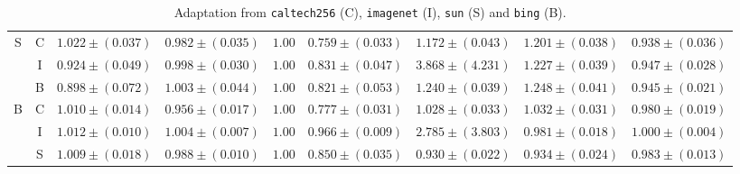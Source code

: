\documentclass[twoside,11pt]{article}
\newcommand{\1}{\mat{1}}
\begin{document}
\begin{table}[t]
\begin{tabular}{ccccccccc}
\hline
 \multirow{3}{*}{ \tiny{S}} & \tiny{C} & $\scriptscriptstyle{ 1.022   \pm
   ( 0.037 )}$ & $\scriptscriptstyle{ 0.982   \pm ( 0.035 )}$ &
 $\scriptscriptstyle{1.00}$&  $\scriptscriptstyle{ 0.759   \pm ( 0.033 )}$ & $\scriptscriptstyle{ 1.172   \pm ( 0.043 )}$ & $\scriptscriptstyle{ 1.201   \pm ( 0.038 )}$ & $\mathbf{\scriptscriptstyle{ 0.938   \pm ( 0.036 )}}$\\
& \tiny{I} & $\mathbf{\scriptscriptstyle{ 0.924   \pm ( 0.049 )}}$ &
$\scriptscriptstyle{ 0.998   \pm ( 0.030 )}$ & $\scriptscriptstyle{1.00}$& $\scriptscriptstyle{ 0.831   \pm ( 0.047 )}$ & $\scriptscriptstyle{ 3.868   \pm ( 4.231 )}$ & $\scriptscriptstyle{ 1.227   \pm ( 0.039 )}$ & $\scriptscriptstyle{ 0.947   \pm ( 0.028 )}$\\
& \tiny{B} & $\mathbf{\scriptscriptstyle{ 0.898   \pm ( 0.072 )}}$ &
$\scriptscriptstyle{ 1.003   \pm ( 0.044 )}$ & $\scriptscriptstyle{1.00}$& $\scriptscriptstyle{ 0.821   \pm ( 0.053 )}$ & $\scriptscriptstyle{ 1.240   \pm ( 0.039 )}$ & $\scriptscriptstyle{ 1.248   \pm ( 0.041 )}$ & $\scriptscriptstyle{ 0.945   \pm ( 0.021 )}$\\
\hline
 \multirow{3}{*}{ \tiny{B}} & \tiny{C} & $\scriptscriptstyle{ 1.010   \pm
   ( 0.014 )}$ & $\mathbf{\scriptscriptstyle{ 0.956   \pm ( 0.017 )}}$ &
 $\scriptscriptstyle{1.00}$&  $\scriptscriptstyle{ 0.777   \pm ( 0.031 )}$ & $\scriptscriptstyle{ 1.028   \pm ( 0.033 )}$ & $\scriptscriptstyle{ 1.032   \pm ( 0.031 )}$ & $\scriptscriptstyle{ 0.980   \pm ( 0.019 )}$\\
& \tiny{I} & $\scriptscriptstyle{ 1.012   \pm ( 0.010 )}$ & $\scriptscriptstyle{
  1.004   \pm ( 0.007 )}$ &  $\scriptscriptstyle{1.00}$& $\scriptscriptstyle{ 0.966   \pm ( 0.009 )}$ & $\scriptscriptstyle{ 2.785   \pm ( 3.803 )}$ & $\mathbf{\scriptscriptstyle{ 0.981   \pm ( 0.018 )}}$ & $\scriptscriptstyle{ 1.000   \pm ( 0.004 )}$\\
& \tiny{S} & $\scriptscriptstyle{ 1.009   \pm ( 0.018 )}$ & $\scriptscriptstyle{ 0.988   \pm ( 0.010 )}$ &$\scriptscriptstyle{1.00}$& $\scriptscriptstyle{ 0.850   \pm ( 0.035 )}$ & $\mathbf{\scriptscriptstyle{ 0.930   \pm ( 0.022 )}}$ & $\scriptscriptstyle{ 0.934   \pm ( 0.024 )}$ & $\scriptscriptstyle{ 0.983   \pm ( 0.013 )}$\\
\hline
 \end{tabular}
\caption{ Adaptation from {\tt caltech256} (C), {\tt imagenet} (I),
  {\tt sun} (S) and {\tt bing} (B).}
\label{table:image}
\end{table}
\end{document}
